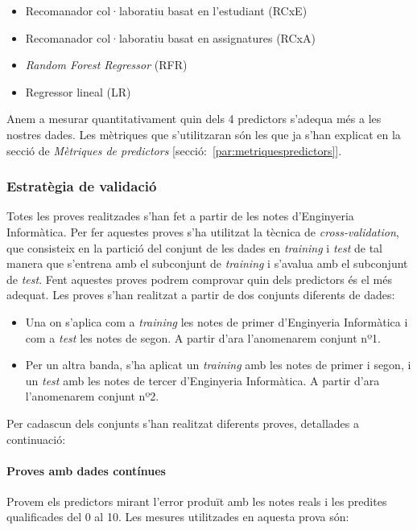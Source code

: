 \documentclass[12pt,a4paper,catalan]{article}
\begin{document}
\begin{itemize}[leftmargin=.5in]
	\item Recomanador col·laboratiu basat en l'estudiant (RCxE)
	\item Recomanador col·laboratiu basat en assignatures (RCxA)
	\item \textit{Random Forest Regressor} (RFR)
	\item Regressor lineal (LR)
\end{itemize}

Anem a mesurar quantitativament quin dels 4 predictors s'adequa més a les nostres dades. Les mètriques que s'utilitzaran són les que ja s'han explicat en la secció de \textit{Mètriques de predictors} [secció:~\ref{par:metriquespredictors}].

\subsubsection{Estratègia de validació}
Totes les proves realitzades s'han fet a partir de les notes d'Enginyeria Informàtica. Per fer aquestes proves s'ha utilitzat la tècnica de \textit{cross-validation}, que  consisteix en la partició del conjunt de les dades en \textit{training} i \textit{test} de tal manera que s'entrena amb el subconjunt de \textit{training} i s'avalua amb el subconjunt de \textit{test}. Fent aquestes proves podrem comprovar quin dels predictors és el més adequat. Les proves s'han realitzat a partir de dos conjunts diferents de dades:

\begin{itemize}[leftmargin=.5in]
	\item Una on s'aplica com a \textit{training} les notes de primer d'Enginyeria Informàtica i com a \textit{test} les notes de segon. A partir d'ara l'anomenarem conjunt nº1.
	\item Per un altra banda, s'ha aplicat un \textit{training} amb les notes de primer i segon, i un \textit{test} amb les notes de tercer d'Enginyeria Informàtica. A partir d'ara l'anomenarem conjunt nº2.
\end{itemize}

Per cadascun dels conjunts s'han realitzat diferents proves, detallades a continuació:

\paragraph{Proves amb dades contínues}
Provem els predictors mirant l'error produït amb les notes reals i les predites qualificades del 0 al 10. Les mesures utilitzades en aquesta prova són:
\end{document}
